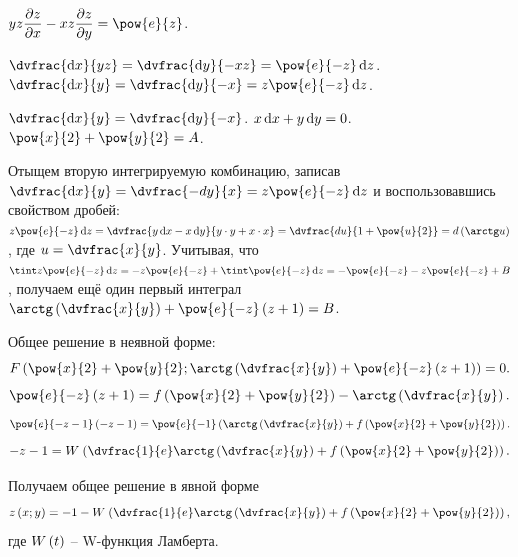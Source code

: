 \documentclass[a5paper,10pt]{article}
\begin{document}
    
    $yz \parder{z} {x} - xz \parder{z} {y} = \pow{e}{z}$.
    
    $\dvfrac {\di x} {yz} = \dvfrac {\di y} {-xz} = \pow{e}{-z} \di z$.
    $\dvfrac {\di x} {y} = \dvfrac {\di y} {-x} = z \pow{e}{-z} \di z$.

    $\dvfrac {\di x} {y} = \dvfrac {\di y} {-x}$.
    $x \di x + y \di y = 0$.
    $\pow{x}{2} + \pow{y}{2} = A$.

    Отыщем вторую интегрируемую комбинацию, записав
    $\dvfrac {\di x} {y} = \dvfrac {-dy} {x} = z \pow{e} {-z} \di z$
    и воспользовавшись свойством дробей:
    $z \pow{e} {-z} \di z = \dvfrac {y \di x - x \di y} {y \cdot y + x \cdot x}
    = \dvfrac {du} {1 + \pow{u}{2}} = d\br{\arctg u}$, где
    $u = \dvfrac {x} {y}$.
    Учитывая, что
    $\tint z \pow{e} {-z} \di z = -z \pow{e} {-z} + \tint \pow{e} {-z} \di z
    = -\pow{e} {-z} - z \pow{e} {-z} + B$,
    получаем ещё один первый интеграл
    $\arctg\br{\dvfrac {x} {y}} + \pow{e} {-z} \br{z + 1} = B$.

    Общее решение в неявной форме:
    $$F\br{\pow{x}{2} + \pow{y}{2}; \arctg\br{\dvfrac {x} {y}} + \pow{e} {-z} \br{z + 1}} = 0.$$
    $$\pow{e} {-z} \br{z + 1} = f\br{\pow{x}{2} + \pow{y}{2}} - \arctg\br{\dvfrac {x} {y}}.$$
    $$\pow{e} {-z - 1} \br{-z - 1} = \pow{e}{-1} \br{\arctg\br{\dvfrac {x} {y}} + f\br{\pow{x}{2} + \pow{y}{2}}}.$$
    $$-z - 1 = W\hspace{0.25mm}\br{\dvfrac {1} {e} \arctg\br{\dvfrac {x} {y}} + f\br{\pow{x}{2} + \pow{y}{2}}}.$$

    Получаем общее решение в явной форме
    $$z\br{x; y} = -1 - W\hspace{0.25mm}\br{\dvfrac {1} {e} \arctg\br{\dvfrac {x} {y}} + f\br{\pow{x}{2} + \pow{y}{2}}},$$
    где $W\left(\hspace{0.01em}t\hspace{0.01em}\right)$ -- W-функция Ламберта.
\end{document}
